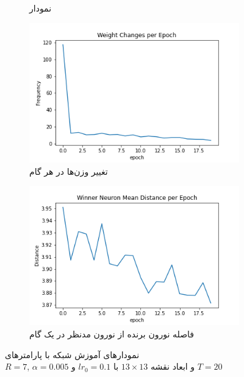 \documentclass[12pt, a4paper]{article}
\begin{document}
\begin{figure}[h]
\begin{subfigure}{0.45\linewidth}
        \caption{نمودار }
    \end{subfigure}
    \newline
    \begin{subfigure}{0.45\linewidth}
        \includegraphics[width=\linewidth]{images/q5/r17/weight_change.png}
        \caption{تغییر وزن‌ها در هر گام}
    \end{subfigure}
    \hfill
    \begin{subfigure}{0.45\linewidth}
        \includegraphics[width=\linewidth]{images/q5/r17/winner_distance.png}
        \caption{فاصله نورون برنده از نورون مدنظر در یک گام}
    \end{subfigure}
    \caption{نمودار‌های آموزش شبکه  با پارامتر‌های \\$R=7$, $\alpha=0.005$ و ابعاد نقشه $13 \times 13$ با $lr_0=0.1$ و $T=20$}
    \label{r17}
\end{figure}
\end{document}

